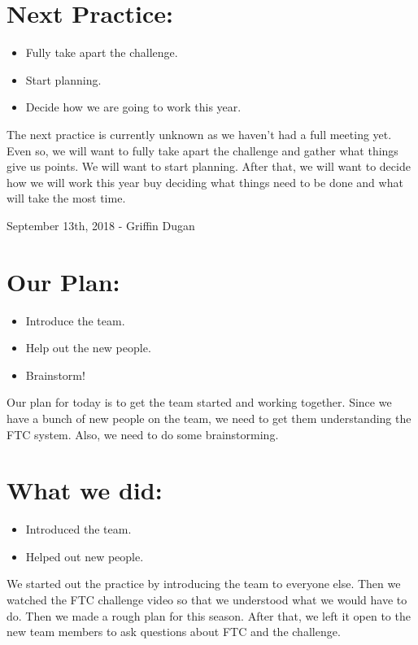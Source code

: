 \documentclass[12pt]{article}
\begin{document}
\section{Next Practice:}
\begin{itemize}
	\item Fully take apart the challenge. 
	\item Start planning. 
	\item Decide how we are going to work this year. 
\end{itemize}

The next practice is currently unknown as we haven't had a full meeting yet. Even so, we will want to fully take apart the challenge and gather what things give us points. We will want to start planning. After that, we will want to decide how we will work this year buy deciding what things need to be done and what will take the most time.

\newpage
\setcounter{section}{0}

September 13th, 2018 - Griffin Dugan


\section{Our Plan:}
\begin{itemize}
	\item Introduce the team.
	\item Help out the new people.
	\item Brainstorm!
\end{itemize}

Our plan for today is to get the team started and working together. Since we have a bunch of new people on the team, we need to get them understanding the FTC system. Also, we need to do some brainstorming.

\section{What we did:}
\begin{itemize}
	\item Introduced the team.
	\item Helped out new people.
\end{itemize}

We started out the practice by introducing the team to everyone else. Then we watched the FTC challenge video so that we understood what we would have to do. Then we made a rough plan for this season. After that, we left it open to the new team members to ask questions about FTC and the challenge.
\end{document}

